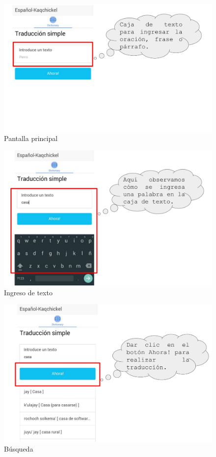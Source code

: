 \documentclass[landscape,12pt]{article}
\begin{document}

\newpage
\pagestyle{fancy}
\begin{figure}[htb]
	\centering
	\includegraphics[width=18cm]{ml_1}	
	\caption{Pantalla principal}
	\label{fig:ml1}
\end{figure}
\newpage
\begin{figure}[htb]
	  \centering
	\includegraphics[width=18cm]{ml_2}
	\caption{Ingreso de texto}
	\label{fig:ml2}
\end{figure}
\newpage
\begin{figure}[htb]
	  \centering
	\includegraphics[width=18cm]{ml_3}
	\caption{Búsqueda}
	\label{fig:ml3}
\end{figure}
\end{document}
